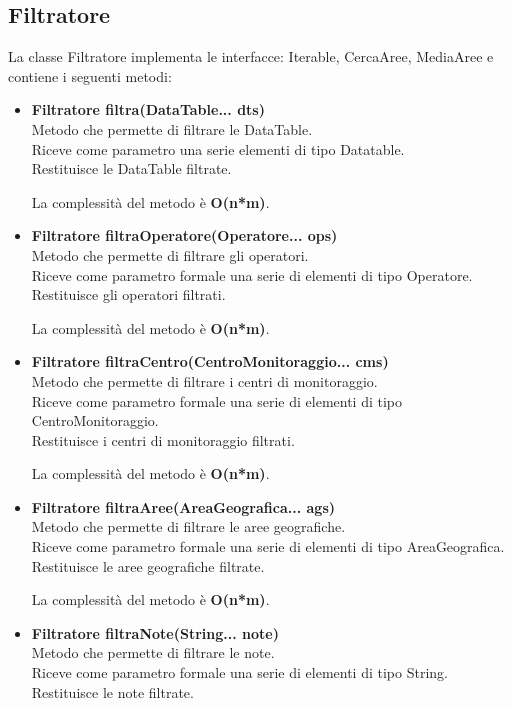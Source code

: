 \documentclass[a4paper, 12pt]{scrreprt}
\begin{document}
			\subsection{Filtratore}
			La classe Filtratore implementa le interfacce: Iterable, CercaAree, MediaAree e contiene i seguenti metodi:
			\begin{itemize}
				\item \textbf{Filtratore filtra(DataTable... dts)}
				\\Metodo che permette di filtrare le DataTable.
				\\Riceve come parametro una serie elementi di tipo Datatable.
				\\Restituisce le DataTable filtrate.
				
				La complessit\`a del metodo è \textbf{O(n*m)}.
				
				\item \textbf{Filtratore filtraOperatore(Operatore... ops)}
				\\Metodo che permette di filtrare gli operatori.
				\\Riceve come parametro formale una serie di elementi di tipo Operatore.
				\\Restituisce gli operatori filtrati.
				
				La complessit\`a del metodo è \textbf{O(n*m)}.
				
				\item \textbf{Filtratore filtraCentro(CentroMonitoraggio... cms)}
				\\Metodo che permette di filtrare i centri di monitoraggio.
				\\Riceve come parametro formale una serie di elementi di tipo CentroMonitoraggio.
				\\Restituisce i centri di monitoraggio filtrati.
				
				La complessit\`a del metodo è \textbf{O(n*m)}.
				
				\item \textbf{Filtratore filtraAree(AreaGeografica... ags)}
				\\Metodo che permette di filtrare le aree geografiche.
				\\Riceve come parametro formale una serie di elementi di tipo AreaGeografica.
				\\Restituisce le aree geografiche filtrate.
				
				La complessit\`a del metodo è \textbf{O(n*m)}.
				
				\item \textbf{Filtratore filtraNote(String... note)}
				\\Metodo che permette di filtrare le note.
				\\Riceve come parametro formale una serie di elementi di tipo String.
				\\Restituisce le note filtrate.
				

\end{itemize}
\end{document}

